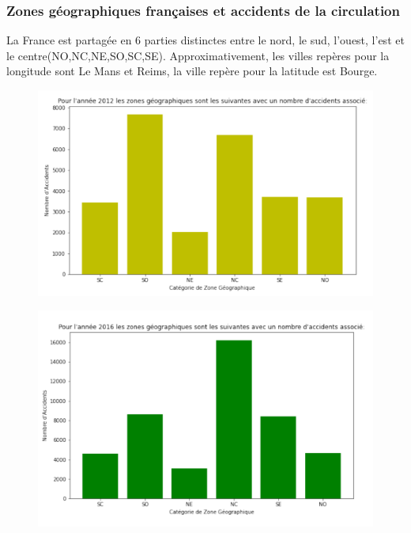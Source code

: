 \documentclass{beamer}
\theoremstyle{definition}
\begin{document}
\begin{frame}
	\frametitle{Zones géographiques françaises et accidents de la circulation}
	La France est partagée en 6 parties distinctes entre le nord, le sud, l'ouest, l'est et le centre(NO,NC,NE,SO,SC,SE). Approximativement, les villes repères pour la longitude sont Le Mans et Reims, la ville repère pour la latitude est Bourge.\\[0.5cm]
	\begin{minipage}[c]{1\linewidth}
		\begin{minipage}[t]{0.48\linewidth}\centering\begin{figure}
				\centering
				\includegraphics[width=1\linewidth]{geo1.png}
		\end{figure}\end{minipage}\hfill 
		\begin{minipage}[t]{0.48\linewidth}\centering\begin{figure}
				\begin{center}
					\includegraphics[width=1\linewidth]{geo2.png}			
				\end{center}
				
		\end{figure}\end{minipage}
	\end{minipage}
	
	
\end{frame}
\end{document}
